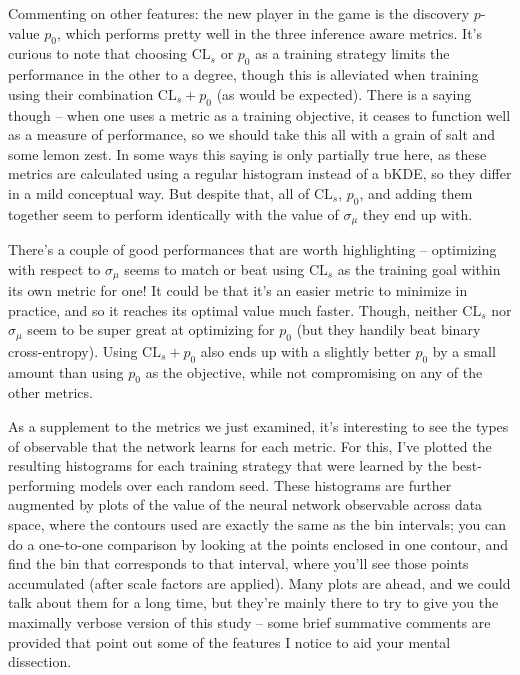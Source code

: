 \documentclass[
  11pt,
  numbers=noendperiod]{book}
\begin{document}
Commenting on other features: the new player in the game is the
discovery \(p\)-value \(p_0\), which performs pretty well in the three
inference aware metrics. It's curious to note that choosing
\(\mathrm{CL}_s\) or \(p_0\) as a training strategy limits the
performance in the other to a degree, though this is alleviated when
training using their combination \(\mathrm{CL}_s + p_0\) (as would be
expected). There is a saying though -- when one uses a metric as a
training objective, it ceases to function well as a measure of
performance, so we should take this all with a grain of salt and some
lemon zest. In some ways this saying is only partially true here, as
these metrics are calculated using a regular histogram instead of a
bKDE, so they differ in a mild conceptual way. But despite that, all of
\(\mathrm{CL}_s\), \(p_0\), and adding them together seem to perform
identically with the value of \(\sigma_{\mu}\) they end up with.

There's a couple of good performances that are worth highlighting --
optimizing with respect to \(\sigma_{\mu}\) seems to match or beat using
\(\mathrm{CL}_s\) as the training goal within its own metric for one! It
could be that it's an easier metric to minimize in practice, and so it
reaches its optimal value much faster. Though, neither \(\mathrm{CL}_s\)
nor \(\sigma_{\mu}\) seem to be super great at optimizing for \(p_0\)
(but they handily beat binary cross-entropy). Using
\(\mathrm{CL}_s + p_0\) also ends up with a slightly better \(p_0\) by a
small amount than using \(p_0\) as the objective, while not compromising
on any of the other metrics.

As a supplement to the metrics we just examined, it's interesting to see
the types of observable that the network learns for each metric. For
this, I've plotted the resulting histograms for each training strategy
that were learned by the best-performing models over each random seed.
These histograms are further augmented by plots of the value of the
neural network observable across data space, where the contours used are
exactly the same as the bin intervals; you can do a one-to-one
comparison by looking at the points enclosed in one contour, and find
the bin that corresponds to that interval, where you'll see those points
accumulated (after scale factors are applied). Many plots are ahead, and
we could talk about them for a long time, but they're mainly there to
try to give you the maximally verbose version of this study -- some
brief summative comments are provided that point out some of the
features I notice to aid your mental dissection.
\end{document}
